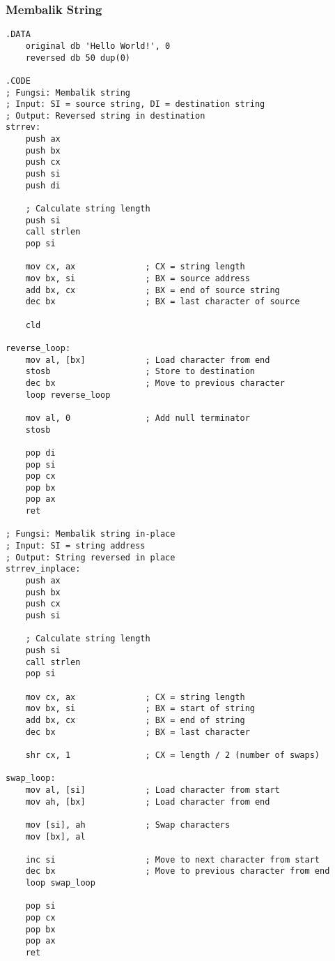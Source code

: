 \documentclass[../main.tex]{subfiles}
\begin{document}
            \subsubsection{Membalik String}
                \begin{lstlisting}[language={[x86masm]Assembler}, caption=Membalik String, label={lst:string-reverse}]
.DATA
    original db 'Hello World!', 0
    reversed db 50 dup(0)

.CODE
; Fungsi: Membalik string
; Input: SI = source string, DI = destination string
; Output: Reversed string in destination
strrev:
    push ax
    push bx
    push cx
    push si
    push di
    
    ; Calculate string length
    push si
    call strlen
    pop si
    
    mov cx, ax              ; CX = string length
    mov bx, si              ; BX = source address
    add bx, cx              ; BX = end of source string
    dec bx                  ; BX = last character of source
    
    cld
    
reverse_loop:
    mov al, [bx]            ; Load character from end
    stosb                   ; Store to destination
    dec bx                  ; Move to previous character
    loop reverse_loop
    
    mov al, 0               ; Add null terminator
    stosb
    
    pop di
    pop si
    pop cx
    pop bx
    pop ax
    ret

; Fungsi: Membalik string in-place
; Input: SI = string address
; Output: String reversed in place
strrev_inplace:
    push ax
    push bx
    push cx
    push si
    
    ; Calculate string length
    push si
    call strlen
    pop si
    
    mov cx, ax              ; CX = string length
    mov bx, si              ; BX = start of string
    add bx, cx              ; BX = end of string
    dec bx                  ; BX = last character
    
    shr cx, 1               ; CX = length / 2 (number of swaps)
    
swap_loop:
    mov al, [si]            ; Load character from start
    mov ah, [bx]            ; Load character from end
    
    mov [si], ah            ; Swap characters
    mov [bx], al
    
    inc si                  ; Move to next character from start
    dec bx                  ; Move to previous character from end
    loop swap_loop
    
    pop si
    pop cx
    pop bx
    pop ax
    ret
                \end{lstlisting}
\end{document}
